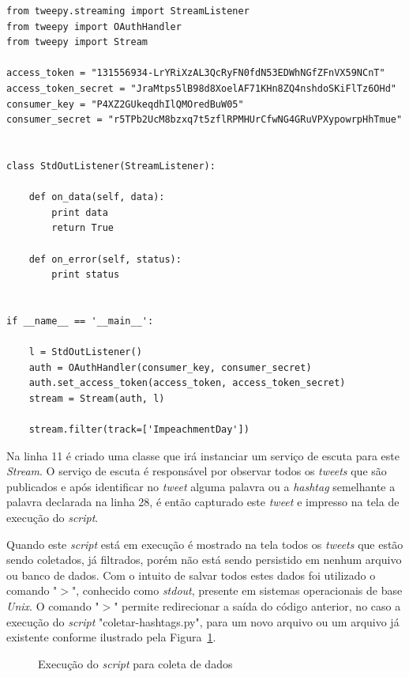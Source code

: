 \lstset{language=Python}
\begin{lstlisting}
from tweepy.streaming import StreamListener
from tweepy import OAuthHandler
from tweepy import Stream

access_token = "131556934-LrYRiXzAL3QcRyFN0fdN53EDWhNGfZFnVX59NCnT"
access_token_secret = "JraMtps5lB98d8XoelAF71KHn8ZQ4nshdoSKiFlTz6OHd"
consumer_key = "P4XZ2GUkeqdhIlQMOredBuW05"
consumer_secret = "r5TPb2UcM8bzxq7t5zflRPMHUrCfwNG4GRuVPXypowrpHhTmue"


class StdOutListener(StreamListener):

    def on_data(self, data):
        print data
        return True

    def on_error(self, status):
        print status


if __name__ == '__main__':

    l = StdOutListener()
    auth = OAuthHandler(consumer_key, consumer_secret)
    auth.set_access_token(access_token, access_token_secret)
    stream = Stream(auth, l)

    stream.filter(track=['ImpeachmentDay'])
\end{lstlisting}

Na linha 11 é criado uma classe que irá instanciar um serviço de escuta para este \textit{Stream}. O serviço de escuta é responsável por observar todos os \textit{tweets} que são publicados e após identificar no \textit{tweet} alguma palavra ou a \textit{hashtag} semelhante a palavra declarada na linha 28, é então capturado este \textit{tweet} e impresso na tela de execução do \textit{script}.

Quando este \textit{script} está em execução é mostrado na tela todos os \textit{tweets} que estão sendo coletados, já filtrados, porém não está sendo persistido em nenhum arquivo ou banco de dados. Com o intuito de salvar todos estes dados foi utilizado o comando "$>$", conhecido como \textit{stdout}, presente em sistemas operacionais de base \textit{Unix}. O comando "$>$" \space permite redirecionar a saída do código anterior, no caso a execução do \textit{script} "coletar-hashtags.py", para um novo arquivo ou um arquivo já existente conforme ilustrado pela Figura~\ref{exec-coleta}.

\begin{figure}[h]
	\centering
	\caption{Execução do \textit{script} para coleta de dados}
	\vspace{-0.3cm}
	\label{exec-coleta}
\end{figure}

